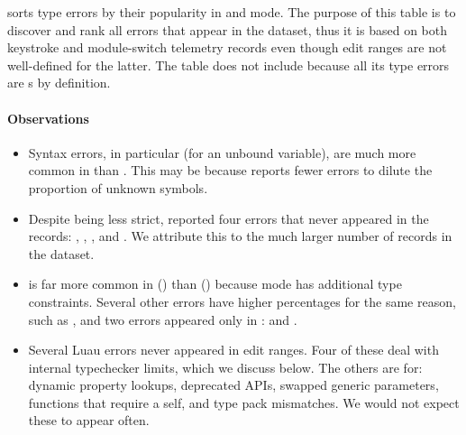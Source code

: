 \documentclass[english,submission,cleveref]{programming}
\begin{document}

 sorts type errors by their popularity
in \mnonstrict{} and \mstrict{} mode.
The purpose of this table is to discover and rank all errors that
appear in the dataset, thus it is based on both keystroke and
module-switch telemetry records even though edit ranges are not well-defined
for the latter.
The table does not include \mnocheck{} because all its type errors are
s by definition.


\paragraph{Observations}

\begin{itemize}
  \item
    Syntax errors, in particular  (for an unbound variable),
    are much more common in \mnonstrict{} than \mstrict{}.
    This may be because \mnonstrict{} reports fewer errors
    to dilute the proportion of unknown symbols.

  \item
    Despite being less strict, \mnonstrict{} reported four errors that
    never appeared in the \mstrict{} records:
    , ,
    , and .
    We attribute this to the much larger number of \mnonstrict{} records in the
    dataset.

  \item
     is far more common in \mstrict{} ()
    than \mnonstrict{} () because \mstrict{} mode
    has additional type constraints.
    Several other errors have higher \mstrict{} percentages for the
    same reason, such as , and
    two errors appeared only in \mstrict{}:
     and .

  \item
    Several Luau errors never appeared in edit ranges.
    Four of these deal with internal typechecker limits, which we discuss
    below.
    The others are for: dynamic property lookups,
    deprecated APIs, swapped generic parameters,
    functions that require a self, and type pack mismatches.
    We would not expect these to appear often.


\end{itemize}
\end{document}
